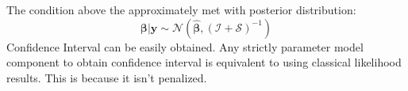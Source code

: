 \begin{remark}
    The condition above the approximately met with posterior distribution:
    \begin{equation*}
        \boldsymbol \beta | \boldsymbol y \sim \mathcal{N}(\hat{\boldsymbol \beta}, (\mathcal{I} + \mathcal{S})^{-1})
    \end{equation*}
    Confidence Interval can be easily obtained. Any strictly parameter model component to obtain confidence interval is equivalent to using classical likelihood results. This is because it isn't penalized.
\end{remark}
